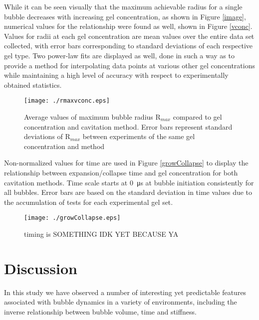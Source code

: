 \documentclass[prl,aps,epsf,twocolumn,superscriptaddress]{revtex4-1}
\begin{document}
While it can be seen visually that the maximum achievable radius for a single bubble decreases with increasing gel concentration, as shown in Figure \ref{image}, numerical values for the relationship were found as well, shown in Figure \ref{vconc}. Values for radii at each gel concentration are mean values over the entire data set collected, with error bars corresponding to standard deviations of each respective gel type. Two power-law fits are displayed as well, done in such a way as to provide a method for interpolating data points at various other gel concentrations while maintaining a high level of accuracy with respect to experimentally obtained statistics.  

\begin{figure}[ht!]
	\begin{center} 
		\texttt{[image: ./rmaxvconc.eps]} 
	\end{center}
	\caption{Average values of maximum bubble radius R$_{max}$ compared to gel concentration and cavitation method. Error bars represent standard deviations of R$_{max}$ between experiments of the same gel concentration and method}
	\label{fig:vconc}
\end{figure}

Non-normalized values for time are used in Figure \ref{growCollapse} to display the relationship between expansion/collapse time and gel concentration for both cavitation methods. Time scale starts at \SI{0}{\us} at bubble initiation consistently for all bubbles. Error bars are based on the standard deviation in time values due to the accumulation of tests for each experimental gel set.

\begin{figure}[ht!]
	\begin{center} 
		\texttt{[image: ./growCollapse.eps]} 
	\end{center}
	\caption{timing is SOMETHING IDK YET BECAUSE YA}
	\label{fig:growCollapse}
\end{figure}

\section{Discussion} %
In this study we have observed a number of interesting yet predictable features associated with bubble dynamics in a variety of environments, including the inverse relationship between bubble volume, time and stiffness. 
\end{document}
